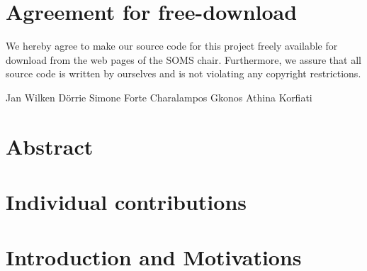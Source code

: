 \documentclass[11pt]{article}
\begin{document}

\newpage


\newpage
\section*{Agreement for free-download}
\bigskip


\bigskip


\large We hereby agree to make our source code for this project freely available for download from the web pages of the SOMS chair.
Furthermore, we assure that all source code is written by ourselves and is not violating any copyright restrictions.

\begin{center}

\bigskip


\bigskip

Jan Wilken D\"{o}rrie \hfill Simone Forte \hfill Charalampos Gkonos \hfill Athina Korfiati

\end{center}
\newpage







\tableofcontents

\newpage




\section{Abstract}

\section{Individual contributions}

\section{Introduction and Motivations}
\end{document}
